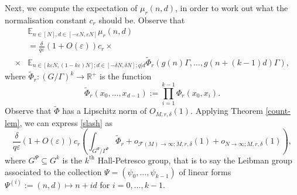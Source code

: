 \documentclass[11pt,reqno]{amsart}
\numberwithin{equation}{section}
\theoremstyle{plain}
\theoremstyle{definition}
\newcommand\E{{\mathbb{E}}}
\newcommand\R{\mathbb{R}}
\newcommand\1{{\bf 1}}
\newcommand\2{{\bf 2}}
\newcommand\eps{\varepsilon}
\newcommand\Grow{{\mathcal F}}
\begin{document}
Next, we compute the expectation of $\mu_r(n,d)$, in order to work out what the normalisation constant $c_r$ should be.  Observe that
\begin{align}\nonumber
&  \E_{n \in [N], d \in [-\eps N, \eps N]}  \mu_r(n,d) \\  \label{slash} & = \frac{\delta}{q\eps} (1+O(\eps)) c_r \times \\ \times &\E_{n \in [k\eps N, (1-k\eps) N]; d \in [-\delta N, \delta N]; q|d} \tilde \Phi_r( g(n) \Gamma, \ldots, g(n+(k-1)d) \Gamma ) ,\nonumber
\end{align}
where $\tilde \Phi_r: (G/\Gamma)^k \to \R^+$ is the function
\begin{equation}\label{far}
 \tilde \Phi_r( x_0,\ldots,x_{d-1} ) := \prod_{i=1}^{k-1} \Phi_r( x_0, x_i ).
\end{equation}
Observe that $\tilde \Phi$ has a Lipschitz norm of $O_{M,r,\delta}(1)$.  Applying Theorem \ref{count-lem}, we can express \eqref{slash} as
$$ \frac{\delta}{q\eps} (1+O(\eps)) c_r ( \int_{G^{\Psi}/\Gamma^{\Psi}} \tilde \Phi_r + o_{\Grow(M) \to \infty; M,r,\delta}(1) + 
o_{N \to \infty; M,r,\delta}(1) ),$$
where $G^{\Psi} \subseteq G^k$ is the $k^{\operatorname{th}}$ Hall-Petresco group, that is to say the Leibman group associated to the collection $\Psi = (\psi_0,\ldots,\psi_{k-1})$ of linear forms $\Psi^{(i)} := (n,d) \mapsto n+id$ for $i=0,\ldots,k-1$.  
\end{document}
